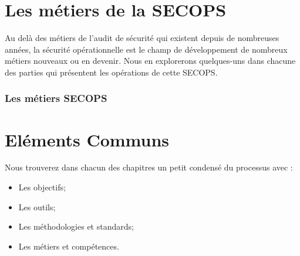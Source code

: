 \section{Les métiers de la SECOPS}

Au delà des métiers de l'audit de sécurité qui existent depuis de nombreuses années, la sécurité opérationnelle est le champ de développement de nombreux métiers nouveaux ou en devenir. Nous en explorerons quelques-uns dans chacune des parties qui présentent les opérations de cette SECOPS.

\begin{frame}
\frametitle<presentation>{Les métiers SECOPS}
\end{frame}

\section{Eléments Communs}

Nous trouverez dans chacun des chapitres un petit condensé du processus avec :

\begin{itemize}
  \item Les objectifs;
  \item Les outils;
  \item Les méthodologies et standards;
  \item Les métiers et compétences.
\end{itemize}
